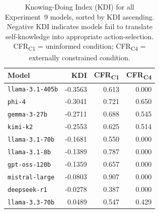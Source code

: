 \begin{table}[t]
\centering
\caption{Knowing-Doing Index (KDI) for all Experiment~9 models, sorted by KDI ascending. Negative KDI indicates models fail to translate self-knowledge into appropriate action-selection. CFR\textsubscript{C1} = uninformed condition; CFR\textsubscript{C4} = externally constrained condition.}
\label{tab:kdi}
\begin{tabular}{l r r r}
\toprule
\textbf{Model} & \textbf{KDI} & \textbf{CFR\textsubscript{C1}} & \textbf{CFR\textsubscript{C4}} \\
\midrule
\texttt{llama{-}3.1{-}405b} & -0.3563 & 0.613 & 0.000 \\
\texttt{phi{-}4} & -0.3041 & 0.721 & 0.650 \\
\texttt{gemma{-}3{-}27b} & -0.2711 & 0.688 & 0.545 \\
\texttt{kimi{-}k2} & -0.2553 & 0.625 & 0.514 \\
\texttt{llama{-}3.1{-}70b} & -0.1681 & 0.550 & 0.000 \\
\texttt{llama{-}3.1{-}8b} & -0.1389 & 0.787 & 0.000 \\
\texttt{gpt{-}oss{-}120b} & -0.1359 & 0.657 & 0.000 \\
\texttt{mistral{-}large} & -0.0803 & 0.907 & 0.000 \\
\texttt{deepseek{-}r1} & -0.0278 & 0.387 & 0.000 \\
\texttt{llama{-}3.3{-}70b} & 0.0489 & 0.547 & 0.429 \\
\bottomrule
\end{tabular}
\end{table}